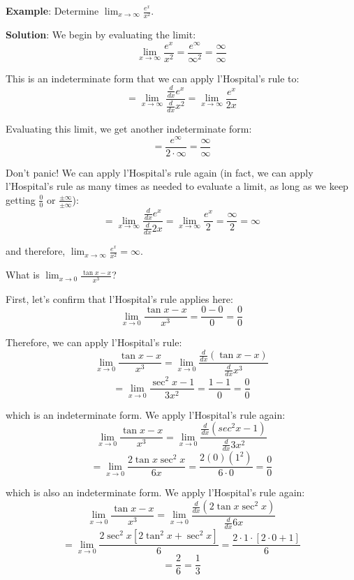 \textbf{Example}: Determine $\lim_{x \to \infty} \frac{e^x}{x^2}$.

\textbf{Solution}: We begin by evaluating the limit:
$$\lim_{x \to \infty} \frac{e^x}{x^2} = \frac{e^{\infty}}{\infty^2} = 
\frac{\infty}{\infty}$$

This is an indeterminate form that we can apply l'Hospital's rule to:
$$= \lim_{x \to \infty} \frac{\frac{d}{dx}e^x}{\frac{d}{dx}x^2} = \lim_{x \to 
\infty} \frac{e^x}{2x}$$

Evaluating this limit, we get another indeterminate form:
$$=\frac{e^{\infty}}{2 \cdot \infty} = \frac{\infty}{\infty}$$

Don't panic! We can apply l'Hospital's rule again (in fact, we can apply 
l'Hospital's rule as many times as needed to evaluate a limit, as long as we 
keep getting $\frac{0}{0}$ or $\frac{\pm \infty}{\pm \infty}$):
$$= \lim_{x \to \infty} \frac{\frac{d}{dx}e^x}{\frac{d}{dx}2x} = \lim_{x \to 
\infty} \frac{e^x}{2} = \frac{\infty}{2} = \infty$$

and therefore, $\lim_{x \to \infty} \frac{e^x}{x^2} = \infty$.

\begin{Exercise}[label=LH1]
What is $\lim_{x \to 0} \frac{\tan{x} - x}{x^3}$?
\end{Exercise}

\begin{Answer}[ref=LH1]
First, let's confirm that l'Hospital's rule applies here:
$$\lim_{x \to 0} \frac{\tan{x} - x}{x^3} = \frac{0 - 0}{0} = \frac{0}{0}$$

Therefore, we can apply l'Hospital's rule:
$$\lim_{x \to 0} \frac{\tan{x} - x}{x^3} = \lim_{x \to 0} \frac{\frac{d}{dx}(\tan{x} - x)}{\frac{d}{dx}x^3}$$
$$= \lim_{x \to 0} \frac{\sec^2{x} - 1}{3x^2} = \frac{1 - 1}{0} = \frac{0}{0}$$

which is an indeterminate form. We apply l'Hospital's rule again:
$$\lim_{x \to 0} \frac{\tan{x} - x}{x^3} = \lim_{x \to 0} \frac{\frac{d}{dx}(sec^2{x} - 1)}{\frac{d}{dx}3x^2}$$
$$= \lim_{x \to 0} \frac{2\tan{x}\sec^2{x}}{6x} = \frac{2(0)(1^2)}{6 \cdot 0} = \frac{0}{0}$$

which is also an indeterminate form. We apply l'Hospital's rule again:
$$\lim_{x \to 0} \frac{\tan{x} - x}{x^3} = \lim_{x \to 0} \frac{\frac{d}{dx}(2\tan{x}\sec^2{x})}{\frac{d}{dx}6x}$$
$$= \lim_{x \to 0} \frac{2\sec^2{x}[2\tan^2{x} + \sec^2{x}]}{6} = \frac{2 \cdot 1 \cdot [2 \cdot 0 + 1]}{6}$$
$$= \frac{2}{6} = \frac{1}{3}$$
\end{Answer}

